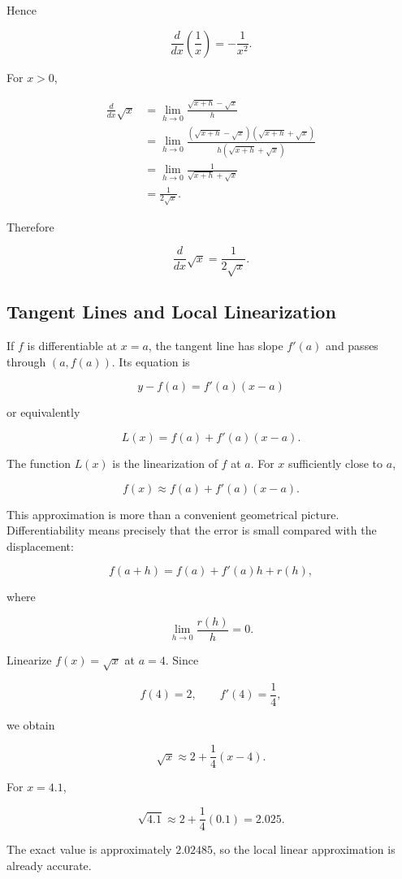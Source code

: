 Hence

\[
\boxed{\frac{d}{dx}\left(\frac1x\right)=-\frac1{x^2}.}
\]


For $x>0$,

\begin{align*}
\frac{d}{dx}\sqrt{x}
&=
\lim_{h\to0}\frac{\sqrt{x+h}-\sqrt{x}}{h}\\
&=
\lim_{h\to0}
\frac{(\sqrt{x+h}-\sqrt{x})(\sqrt{x+h}+\sqrt{x})}
{h(\sqrt{x+h}+\sqrt{x})}\\
&=
\lim_{h\to0}
\frac{1}{\sqrt{x+h}+\sqrt{x}}\\
&=
\frac1{2\sqrt{x}}.
\end{align*}

Therefore

\[
\boxed{\frac{d}{dx}\sqrt{x}=\frac1{2\sqrt{x}}.}
\]

\subsection{Tangent Lines and Local Linearization}

If $f$ is differentiable at $x=a$, the tangent line has slope $f'(a)$ and passes through $(a,f(a))$. Its equation is

\begin{equation}
\boxed{
y-f(a)=f'(a)(x-a)
}
\label{eq:tangent-line}
\end{equation}

or equivalently

\begin{equation}
\boxed{
L(x)=f(a)+f'(a)(x-a).
}
\label{eq:linearization}
\end{equation}

The function $L(x)$ is the linearization of $f$ at $a$. For $x$ sufficiently close to $a$,

\[
f(x)\approx f(a)+f'(a)(x-a).
\]

This approximation is more than a convenient geometrical picture. Differentiability means precisely that the error is small compared with the displacement:

\[
f(a+h)=f(a)+f'(a)h+r(h),
\]

where

\[
\lim_{h\to0}\frac{r(h)}{h}=0.
\]

\begin{bookexample}
Linearize $f(x)=\sqrt{x}$ at $a=4$. Since

\[
f(4)=2,
\qquad
f'(4)=\frac14,
\]

we obtain

\[
\sqrt{x}\approx2+\frac14(x-4).
\]

For $x=4.1$,

\[
\sqrt{4.1}\approx2+\frac14(0.1)=2.025.
\]

The exact value is approximately $2.02485$, so the local linear approximation is already accurate.
\end{bookexample}

